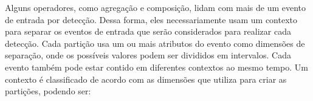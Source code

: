 Alguns operadores, como agregação e composição, lidam com mais de um evento de entrada por detecção. Dessa forma, eles necessariamente usam um contexto para separar os eventos de entrada que serão considerados para realizar cada detecção.
Cada partição usa um ou mais atributos do evento como dimensões de separação, onde os possíveis valores podem ser divididos em intervalos. Cada evento também pode estar contido em diferentes contextos ao mesmo tempo. 
Um contexto  é classificado de acordo com as dimensões que utiliza para criar as partições, podendo ser:
